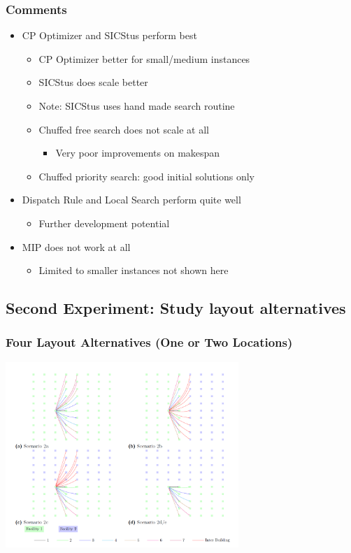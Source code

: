 \begin{frame}
\frametitle{Comments}
\begin{itemize}
\item CP Optimizer and SICStus perform best
\begin{itemize}
\item CP Optimizer better for small/medium instances
\item SICStus does scale better
\item Note: SICStus uses hand made search routine
\item Chuffed free search does not scale at all
\begin{itemize}
\item Very poor improvements on makespan
\end{itemize}
\item Chuffed priority search: good initial solutions only
\end{itemize}

\item Dispatch Rule and Local Search perform quite well
\begin{itemize}
\item Further development potential
\end{itemize}

\item MIP does not work at all
\begin{itemize}
\item Limited to smaller instances not shown here
\end{itemize}

\end{itemize}
\end{frame}

\subsection{Second Experiment: Study layout alternatives}

\begin{frame}
\frametitle{Four Layout Alternatives (One or Two Locations)}
\includegraphics[width=8.8cm]{imagesjj/layoutalternatives}
\end{frame}


